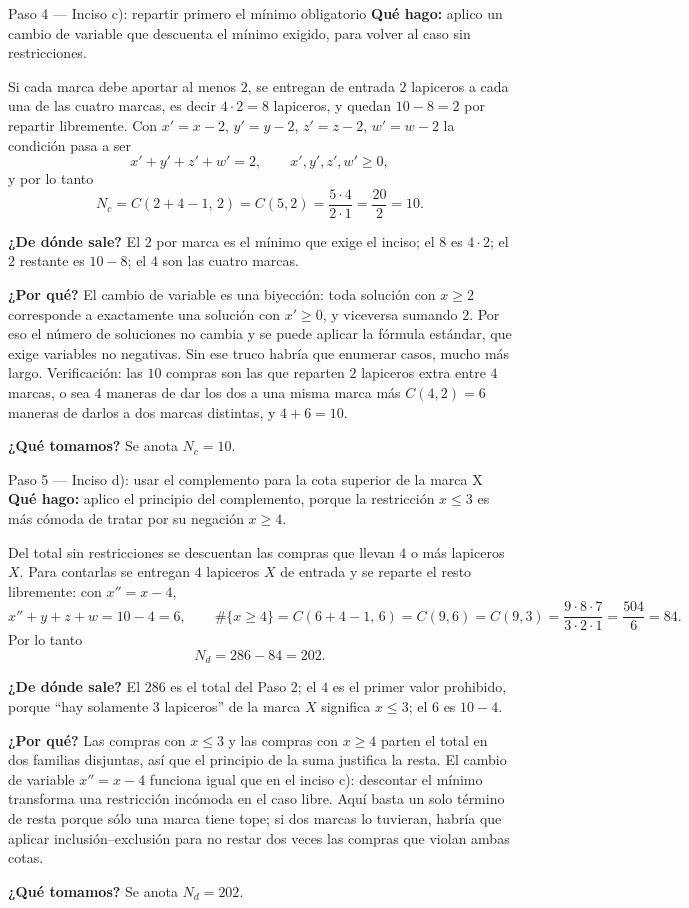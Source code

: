 \documentclass[11pt]{article}
\begin{document}
\begin{paso}{Paso 4 --- Inciso c): repartir primero el mínimo obligatorio}
\textbf{Qué hago:} aplico un cambio de variable que descuenta el mínimo exigido, para volver al caso sin restricciones.

Si cada marca debe aportar al menos $2$, se entregan de entrada $2$ lapiceros a cada una de las cuatro marcas, es decir $4\cdot 2=8$ lapiceros, y quedan $10-8=2$ por repartir libremente. Con $x'=x-2$, $y'=y-2$, $z'=z-2$, $w'=w-2$ la condición pasa a ser
\[
  x'+y'+z'+w' = 2,\qquad x',y',z',w'\ge 0 ,
\]
y por lo tanto
\[
  N_c = C(2+4-1,\,2)=C(5,2)=\frac{5\cdot 4}{2\cdot 1}=\frac{20}{2}=10 .
\]

\textbf{¿De dónde sale?} El $2$ por marca es el mínimo que exige el inciso; el $8$ es $4\cdot 2$; el $2$ restante es $10-8$; el $4$ son las cuatro marcas.

\textbf{¿Por qué?} El cambio de variable es una biyección: toda solución con $x\ge 2$ corresponde a exactamente una solución con $x'\ge 0$, y viceversa sumando $2$. Por eso el número de soluciones no cambia y se puede aplicar la fórmula estándar, que exige variables no negativas. Sin ese truco habría que enumerar casos, mucho más largo. Verificación: las $10$ compras son las que reparten $2$ lapiceros extra entre $4$ marcas, o sea $4$ maneras de dar los dos a una misma marca más $C(4,2)=6$ maneras de darlos a dos marcas distintas, y $4+6=10$.

\textbf{¿Qué tomamos?} Se anota $N_c=10$.
\end{paso}

\begin{paso}{Paso 5 --- Inciso d): usar el complemento para la cota superior de la marca X}
\textbf{Qué hago:} aplico el principio del complemento, porque la restricción $x\le 3$ es más cómoda de tratar por su negación $x\ge 4$.

Del total sin restricciones se descuentan las compras que llevan $4$ o más lapiceros $X$. Para contarlas se entregan $4$ lapiceros $X$ de entrada y se reparte el resto libremente: con $x''=x-4$,
\[
  x''+y+z+w = 10-4 = 6,\qquad
  \#\{x\ge 4\} = C(6+4-1,\,6)=C(9,6)=C(9,3)=\frac{9\cdot 8\cdot 7}{3\cdot 2\cdot 1}=\frac{504}{6}=84 .
\]
Por lo tanto
\[
  N_d = 286 - 84 = 202 .
\]

\textbf{¿De dónde sale?} El $286$ es el total del Paso 2; el $4$ es el primer valor prohibido, porque ``hay solamente 3 lapiceros'' de la marca $X$ significa $x\le 3$; el $6$ es $10-4$.

\textbf{¿Por qué?} Las compras con $x\le 3$ y las compras con $x\ge 4$ parten el total en dos familias disjuntas, así que el principio de la suma justifica la resta. El cambio de variable $x''=x-4$ funciona igual que en el inciso c): descontar el mínimo transforma una restricción incómoda en el caso libre. Aquí basta un solo término de resta porque sólo una marca tiene tope; si dos marcas lo tuvieran, habría que aplicar inclusión--exclusión para no restar dos veces las compras que violan ambas cotas.

\textbf{¿Qué tomamos?} Se anota $N_d=202$.
\end{paso}
\end{document}
